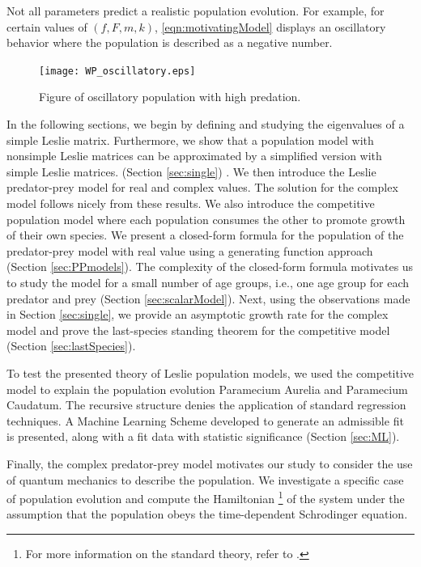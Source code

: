 \documentclass[11pt,reqno]{amsart}
\numberwithin{equation}{section}
\theoremstyle{plain}
\begin{document}
Not all parameters predict a realistic population evolution. For example, for certain values of $(f, F, m, k)$, \ref{eqn:motivatingModel} displays an oscillatory behavior where the population is described as a negative number. 

\begin{figure}[htp]
    \centering
    \texttt{[image: WP\_oscillatory.eps]} %
    \caption{Figure of oscillatory population with high predation.}
    \label{fig:example}
\end{figure}

In the following sections, we begin by defining and studying the eigenvalues of a simple
Leslie matrix. Furthermore, we show that a population model with nonsimple Leslie matrices can be approximated by a simplified version with simple Leslie matrices.  (Section \ref{sec:single}) 
. We then introduce the Leslie predator-prey model for real and complex values. The solution for the complex model follows nicely from these results. 
We also introduce the competitive population model where each population consumes the other to promote growth of their own species. 
We present a closed-form formula for
the population of the predator-prey model with real value
using a generating function approach (Section \ref{sec:PPmodels}). The complexity of the closed-form formula motivates us to study the model for a
small number of age groups, i.e., one age group for each predator and prey
(Section \ref{sec:scalarModel}). Next, using the observations made in Section \ref{sec:single}, we provide an
asymptotic growth rate for the complex model and prove the last-species standing
theorem for the competitive model (Section \ref{sec:lastSpecies}). 

To test the presented theory of Leslie population models, we used the competitive model to explain the population evolution Paramecium Aurelia and Paramecium Caudatum. The recursive structure denies the application of standard regression techniques. A Machine Learning Scheme developed to generate an admissible fit is presented, along with a fit data with statistic significance (Section \ref{sec:ML}). 

Finally, the complex predator-prey model motivates our study to consider
the use of quantum mechanics
to describe the population. We investigate a specific case of population evolution and compute the %
Hamiltonian \footnote{For more information on the standard theory, refer to \cite{Bag19}.} of the system under the assumption that the population obeys the time-dependent Schrodinger equation. 
\end{document}
